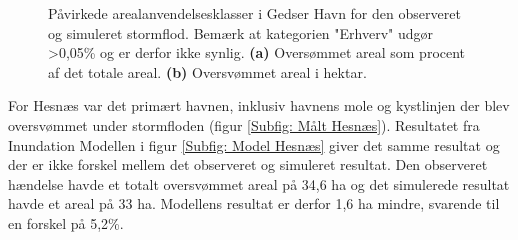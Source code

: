 \begin{figure}[H]
\begin{subfigure}[b]{0.5\textwidth}
        \caption{}
        \label{Subfig: Hektar areal Gedser}
    \end{subfigure}
    \caption{Påvirkede arealanvendelsesklasser i Gedser Havn for den observeret og simuleret stormflod. Bemærk at kategorien "Erhverv" \hspace{0.1cm}udgør >0,05\% og er derfor ikke synlig. \textbf{(a)} Oversømmet areal som procent af det totale areal. \textbf{(b)} Oversvømmet areal i hektar.}
    \label{Figur: Påvirket arealanvendelse Gedser}
\end{figure}

For Hesnæs var det primært havnen, inklusiv havnens mole og kystlinjen der blev oversvømmet under stormfloden (figur \ref{Subfig: Målt Hesnæs}). Resultatet fra Inundation Modellen i figur \ref{Subfig: Model Hesnæs} giver det samme resultat og der er ikke forskel mellem det observeret og simuleret resultat. Den observeret hændelse havde et totalt oversvømmet areal på 34,6 ha og det simulerede resultat havde et areal på 33 ha. Modellens resultat er derfor 1,6 ha mindre, svarende til en forskel på 5,2\%.
